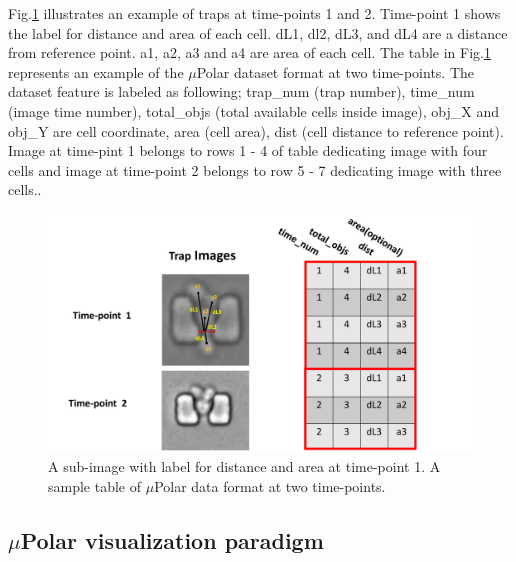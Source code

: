 \documentclass[conference]{IEEEtran}
\begin{document}
Fig.\ref{fig:table} illustrates an example of traps at time-points 1 and 2. Time-point 1 shows the label for distance and area of each cell. dL1, dl2, dL3, and dL4 are a distance from reference point. a1, a2, a3 and a4 are area of each cell. The table in Fig.\ref{fig:table} represents an example of the $\mu$Polar dataset format at two time-points. The dataset feature is labeled as following; trap\_num (trap number), time\_num (image time number), total\_objs (total available cells inside image), obj\_X and obj\_Y are cell coordinate, area (cell area), dist (cell distance to reference point). Image at time-pint 1 belongs to rows 1 - 4 of table dedicating image with four cells and image at time-point 2 belongs to row 5 - 7 dedicating image with three cells.. 

\begin{figure}
\centering
\includegraphics[width=\textwidth,height=10 cm]{Patterns/table.pdf}
\caption{ A sub-image with label for distance and area at time-point 1. A sample table of $\mu$Polar data format at two time-points.}
\label{fig:table}
\end{figure}


\subsection{$\mu$Polar visualization paradigm}
\end{document}

